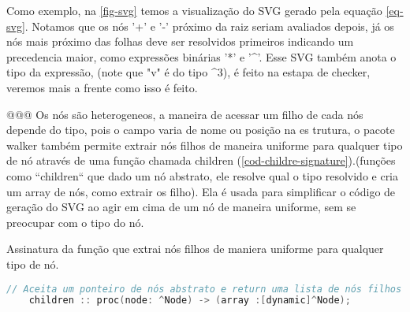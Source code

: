 Como exemplo, na \autoref{fig-svg} temos a visualização do SVG gerado pela equação \autoref{eq-svg}. Notamos que os nós '+' e '-' próximo da raiz seriam avaliados depois, já os nós mais próximo das folhas deve ser resolvidos primeiros indicando um precedencia maior, como expressões binárias '*' e '^'. Esse SVG também anota o tipo da expressão, (note que "v" é do tipo ^3), é feito na estapa de checker, veremos mais a frente como isso é feito.
 

@@@
Os nós são heterogeneos, a maneira de acessar um filho de cada nós depende do tipo, pois o campo varia de nome ou posição na es trutura, o pacote walker também permite extrair nós filhos de maneira uniforme para qualquer tipo de nó através de uma função chamada children (\autoref{cod-childre-signature}).(funções como ``children`` que dado um nó abstrato, ele resolve qual o tipo resolvido e cria um array de nós, como extrair os filho). Ela é usada para simplificar o código de geração do SVG ao agir em cima de um nó de maneira uniforme, sem se preocupar com o tipo do nó.

\begin{codigo}[htb]
        \caption{\small Assinatura da função que extrai nós filhos de maniera uniforme para qualquer tipo de nó. }
        \label{cod-childre-signature}
  \begin{lstlisting}[language = C]
    // Aceita um ponteiro de nós abstrato e return uma lista de nós filhos
    children :: proc(node: ^Node) -> (array :[dynamic]^Node);
  \end{lstlisting}
\end{codigo}



